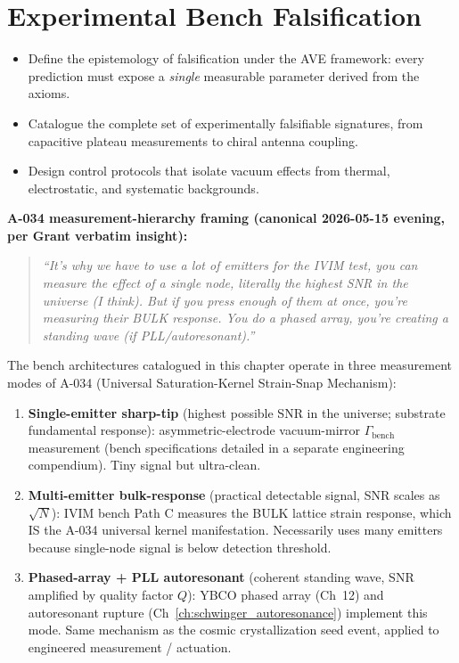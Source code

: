 \chapter{Experimental Bench Falsification}


\begin{objectivebox}
\begin{itemize}
    \item Define the epistemology of falsification under the AVE framework: every prediction must expose a \emph{single} measurable parameter derived from the axioms.
    \item Catalogue the complete set of experimentally falsifiable signatures, from capacitive plateau measurements to chiral antenna coupling.
    \item Design control protocols that isolate vacuum effects from thermal, electrostatic, and systematic backgrounds.
\end{itemize}
\end{objectivebox}

\textbf{A-034 measurement-hierarchy framing (canonical 2026-05-15 evening,
per Grant verbatim insight):}

\begin{quote}
\itshape ``It's why we have to use a lot of emitters for the IVIM test, you
can measure the effect of a single node, literally the highest SNR in the
universe (I think). But if you press enough of them at once, you're
measuring their BULK response. You do a phased array, you're creating a
standing wave (if PLL/autoresonant).''
\end{quote}

The bench architectures catalogued in this chapter operate in three
measurement modes of A-034 (Universal Saturation-Kernel Strain-Snap
Mechanism):

\begin{enumerate}
    \item \textbf{Single-emitter sharp-tip} (highest possible SNR in the
    universe; substrate fundamental response): asymmetric-electrode
    vacuum-mirror $\Gamma_{\text{bench}}$ measurement (bench specifications
    detailed in a separate engineering compendium). Tiny signal but ultra-clean.
    \item \textbf{Multi-emitter bulk-response} (practical detectable signal,
    SNR scales as $\sqrt{N}$): IVIM bench Path C measures the BULK lattice
    strain response, which IS the A-034 universal kernel manifestation.
    Necessarily uses many emitters because single-node signal is below
    detection threshold.
    \item \textbf{Phased-array + PLL autoresonant} (coherent standing wave,
    SNR amplified by quality factor $Q$): YBCO phased array (Ch~12) and
    autoresonant rupture (Ch~\ref{ch:schwinger_autoresonance}) implement
    this mode. Same mechanism as the cosmic crystallization seed event,
    applied to engineered measurement / actuation.
\end{enumerate}

